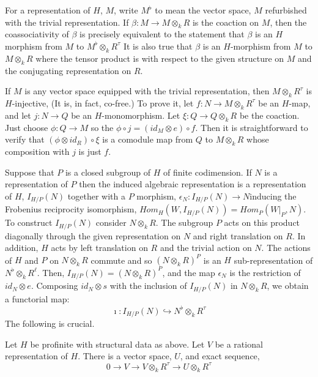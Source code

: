 For a representation of $H$, $M$, write $M^{\flat}$ to mean the vector space, $M$ refurbished with the trivial representation. If $\beta : M \rightarrow M \otimes_{k}R$ is the coaction on $M$, then the coassociativity of $\beta$ is precisely equivalent to the statement that $\beta$ is an $H$ morphism from $M$ to $M^{\flat} \otimes_{k}R^{\tau}$ It is also true that $\beta $ is an $H$-morphism from $M$ to $M \otimes_{k} R$ where the tensor product is with respect to the given structure on $M$ and the conjugating representation on $R$.

If $M$ is any vector space equipped with the trivial representation, then $M\otimes_{k} R^{\tau}$ is $H$-injective, (It is, in fact, co-free.) To prove it, let $f: N \rightarrow M\otimes_{k}R^{\tau}$ be an $H$-map, and let $j : N \rightarrow Q$ be an $H$-monomorphism. Let $\xi : Q \rightarrow Q \otimes_{k} R$ be the coaction. Just choose $\phi : Q \rightarrow M$ so the $\phi \circ j = (id_{M}\otimes e) \circ f$. Then it is straightforward to verify that $(\phi \otimes id_{R}) \circ \xi $ is a comodule map from $Q$ to $M \otimes_{k} R$ whose composition with $j$ is just $f$.

Suppose that $P$ is a closed subgroup of $H$ of finite codimension. If $N$ is a representation of $P$ then the induced algebraic representation is a representation of $H$, $I_{H/P}(N)$ together with a $P$ morphism,
$\epsilon_{N} : I_{H/P}(N)\rightarrow N$\pageoriginale inducing the Frobenius reciprocity isomorphism, $Hom_{H}(W, I_{H/P}(N))= Hom_{P}(W|_{P}, N)$. To construct $I_{H/P}(N)$ consider $N \otimes_{k} R$. The subgroup $P$ acts on this product diagonally through the given representation on $N$ and right translation on $R$. In addition, $H$ acts by left translation on $R$ and the trivial action on $N$. The actions of $H$ and $P$ on $N \otimes_{k} R$ commute and so $(N \otimes_{k} R)^{P}$ is an $H$ sub-representation of $N^{\flat} \otimes_{k} R^{\ell}$. Then, $I_{H/P}(N) = (N \otimes_{k} R)^{P}$, and the map $\epsilon_{N}$ is the restriction of $id_{N}\otimes e$. Composing $id_{N}\otimes s$ with the inclusion of $I_{H/P}(N)$ in $N\otimes_{k}R$, we obtain a functorial map: 
\begin{equation*}\label{chap6-eq-14.1}
\imath : I_{H/P}(N) \hookrightarrow N^{\flat} \otimes_{k} R^{\tau}\tag{14.1}
\end{equation*}
The following is crucial.

\setcounter{definition}{1}
\begin{seclem}\label{chap6-lemma-14.2}
Let $H$ be profinite with structural data as above. Let $V$ be a rational representation of $H$. There is a vector space, $U$, and exact sequence,
$$
0 \rightarrow V \rightarrow V\otimes_{k} R^{\tau} \rightarrow U \otimes_{k}R^{\tau}
$$
\end{seclem}

